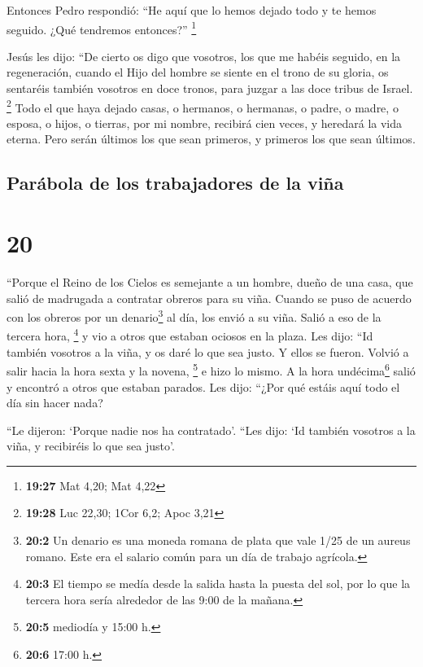  Entonces Pedro respondió: ``He aquí que lo hemos dejado
todo y te hemos seguido. ¿Qué tendremos entonces?'' \footnote{\textbf{19:27}
  Mat 4,20; Mat 4,22}

 Jesús les dijo: ``De cierto os digo que vosotros, los
que me habéis seguido, en la regeneración, cuando el Hijo del hombre se
siente en el trono de su gloria, os sentaréis también vosotros en doce
tronos, para juzgar a las doce tribus de Israel. \footnote{\textbf{19:28}
  Luc 22,30; 1Cor 6,2; Apoc 3,21}  Todo el que haya
dejado casas, o hermanos, o hermanas, o padre, o madre, o esposa, o
hijos, o tierras, por mi nombre, recibirá cien veces, y heredará la vida
eterna.  Pero serán últimos los que sean primeros, y
primeros los que sean últimos.

\hypertarget{paruxe1bola-de-los-trabajadores-de-la-viuxf1a}{%
\subsection{Parábola de los trabajadores de la
viña}\label{paruxe1bola-de-los-trabajadores-de-la-viuxf1a}}

\hypertarget{section-19}{%
\section{20}\label{section-19}}

 ``Porque el Reino de los Cielos es semejante a un hombre,
dueño de una casa, que salió de madrugada a contratar obreros para su
viña.  Cuando se puso de acuerdo con los obreros por un
denario\footnote{\textbf{20:2} Un denario es una moneda romana de plata
  que vale 1/25 de un aureus romano. Este era el salario común para un
  día de trabajo agrícola.} al día, los envió a su viña. 
Salió a eso de la tercera hora, \footnote{\textbf{20:3} El tiempo se
  medía desde la salida hasta la puesta del sol, por lo que la tercera
  hora sería alrededor de las 9:00 de la mañana.} y vio a otros que
estaban ociosos en la plaza.  Les dijo: ``Id también
vosotros a la viña, y os daré lo que sea justo. Y ellos se fueron.
 Volvió a salir hacia la hora sexta y la novena,
\footnote{\textbf{20:5} mediodía y 15:00 h.} e hizo lo mismo.
 A la hora undécima\footnote{\textbf{20:6} 17:00 h.} salió
y encontró a otros que estaban parados. Les dijo: ``¿Por qué estáis aquí
todo el día sin hacer nada?

 ``Le dijeron: `Porque nadie nos ha contratado'. ``Les
dijo: `Id también vosotros a la viña, y recibiréis lo que sea justo'.

